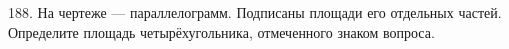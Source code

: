 188. На чертеже --- параллелограмм. Подписаны площади его отдельных частей. Определите площадь четырёхугольника, отмеченного знаком вопроса.
\begin{figure}[ht!]
\end{figure}\\
